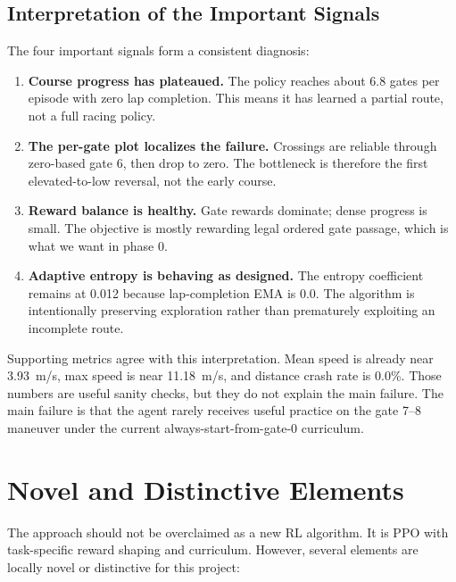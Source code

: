 \documentclass[11pt]{article}
\begin{document}
\subsection{Interpretation of the Important Signals}

The four important signals form a consistent diagnosis:

\begin{enumerate}
  \item \textbf{Course progress has plateaued.} The policy reaches about 6.8
  gates per episode with zero lap completion. This means it has learned a
  partial route, not a full racing policy.

  \item \textbf{The per-gate plot localizes the failure.} Crossings are reliable
  through zero-based gate 6, then drop to zero. The bottleneck is therefore the
  first elevated-to-low reversal, not the early course.

  \item \textbf{Reward balance is healthy.} Gate rewards dominate; dense progress
  is small. The objective is mostly rewarding legal ordered gate passage, which
  is what we want in phase 0.

  \item \textbf{Adaptive entropy is behaving as designed.} The entropy
  coefficient remains at 0.012 because lap-completion EMA is 0.0. The algorithm
  is intentionally preserving exploration rather than prematurely exploiting an
  incomplete route.
\end{enumerate}

Supporting metrics agree with this interpretation. Mean speed is already near
\SI{3.93}{m/s}, max speed is near \SI{11.18}{m/s}, and distance crash rate is
0.0\%. Those numbers are useful sanity checks, but they do not explain the main
failure. The main failure is that the agent rarely receives useful practice on
the gate 7--8 maneuver under the current always-start-from-gate-0 curriculum.

\section{Novel and Distinctive Elements}

The approach should not be overclaimed as a new RL algorithm. It is PPO with
task-specific reward shaping and curriculum. However, several elements are
locally novel or distinctive for this project:
\end{document}
